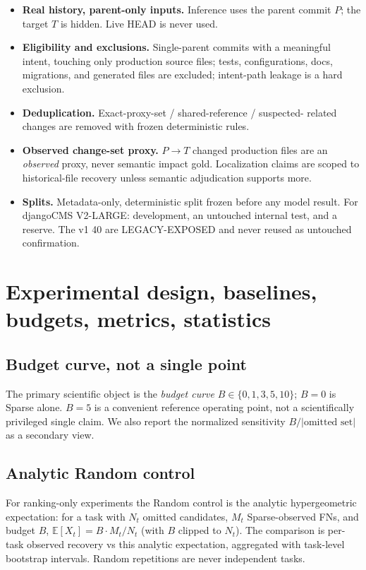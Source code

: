 \documentclass[11pt,a4paper]{article}
\begin{document}
\begin{itemize}
  \item \textbf{Real history, parent-only inputs.} Inference uses the parent
        commit $P$; the target $T$ is hidden. Live HEAD is never used.
  \item \textbf{Eligibility and exclusions.} Single-parent commits with a
        meaningful intent, touching only production source files; tests,
        configurations, docs, migrations, and generated files are excluded;
        intent-path leakage is a hard exclusion.
  \item \textbf{Deduplication.} Exact-proxy-set / shared-reference / suspected-
        related changes are removed with frozen deterministic rules.
  \item \textbf{Observed change-set proxy.} $P\!\to\!T$ changed production
        files are an \emph{observed} proxy, never semantic impact gold.
        Localization claims are scoped to historical-file recovery unless
        semantic adjudication supports more.
  \item \textbf{Splits.} Metadata-only, deterministic split frozen before any
        model result. For djangoCMS V2-LARGE: development, an untouched
        internal test, and a reserve. The v1 40 are LEGACY-EXPOSED and never
        reused as untouched confirmation.
\end{itemize}

\section{Experimental design, baselines, budgets, metrics, statistics}
\label{sec:design}

\subsection{Budget curve, not a single point}
The primary scientific object is the \emph{budget curve} $B \in \{0,1,3,5,10\}$;
$B{=}0$ is Sparse alone. $B{=}5$ is a convenient reference operating point, not
a scientifically privileged single claim. We also report the normalized
sensitivity $B / |\text{omitted set}|$ as a secondary view.

\subsection{Analytic Random control}
For ranking-only experiments the Random control is the analytic hypergeometric
expectation: for a task with $N_t$ omitted candidates, $M_t$ Sparse-observed
FNs, and budget $B$, $\mathbb{E}[X_t] = B \cdot M_t / N_t$ (with $B$ clipped to
$N_t$). The comparison is per-task observed recovery vs this analytic
expectation, aggregated with task-level bootstrap intervals. Random repetitions
are never independent tasks.
\end{document}
